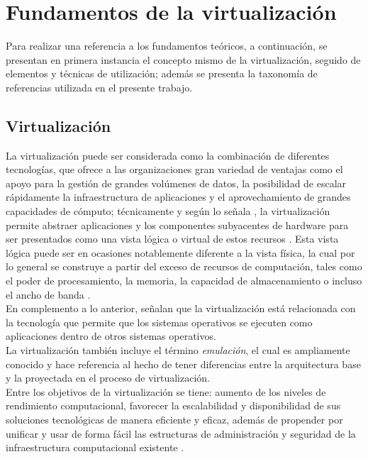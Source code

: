 \section{Fundamentos de la virtualización}\label{sec:fundamentos}
\vspace{5mm}
Para realizar una referencia a los fundamentos teóricos, a continuación, se presentan en primera instancia el concepto mismo de la virtualización, seguido de elementos y técnicas de utilización; además se presenta la  taxonomía de referencias utilizada en el presente trabajo. 

\subsection{Virtualización}
\vspace{5mm}
La virtualización puede ser considerada como la combinación de diferentes tecnologías, que ofrece a las organizaciones gran variedad de ventajas como el apoyo para la gestión de grandes volúmenes de datos, la posibilidad de escalar rápidamente la infraestructura de aplicaciones y el aprovechamiento de grandes capacidades de cómputo; técnicamente y según lo señala \textcite{Kusnetzky2011}, la virtualización permite abstraer aplicaciones y los componentes subyacentes de hardware para ser presentados como una vista lógica o virtual de estos recursos \parencite{AbdElRahem2016}. Esta vista lógica puede ser en ocasiones notablemente diferente a la vista física, la cual por lo general se construye a partir del exceso de recursos de computación, tales como el poder de  procesamiento, la memoria, la capacidad de almacenamiento o incluso el ancho de banda \parencite{Stallings2015}.\\

En complemento a lo anterior, \textcite{Silberschatz2014} señalan que la virtualización está relacionada con la tecnología que permite que los sistemas operativos se ejecuten como aplicaciones dentro de otros sistemas operativos. \\

La virtualización también incluye el término \textit{emulación}, el cual es ampliamente conocido y hace referencia al hecho de tener diferencias entre la arquitectura base y la proyectada en el proceso de virtualización.\\

Entre los objetivos de la virtualización se tiene: aumento de los niveles de rendimiento computacional, favorecer la escalabilidad y disponibilidad de sus soluciones tecnológicas de manera eficiente y eficaz, además de propender por unificar y usar de forma fácil las estructuras de administración y seguridad de la infraestructura computacional existente \parencite{Kusnetzky2011, Hui2014}. \\


